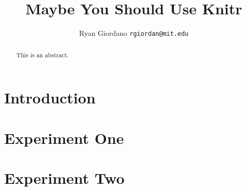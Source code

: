 \documentclass[11pt]{article}
\begin{document}
\title{Maybe You Should Use Knitr}

\author{Ryan Giordano \texttt{rgiordan@mit.edu}}

\maketitle

\begin{abstract}
This is an abstract.
\end{abstract}

\section{Introduction}


\section{Experiment One}


\section{Experiment Two}



\end{document}
